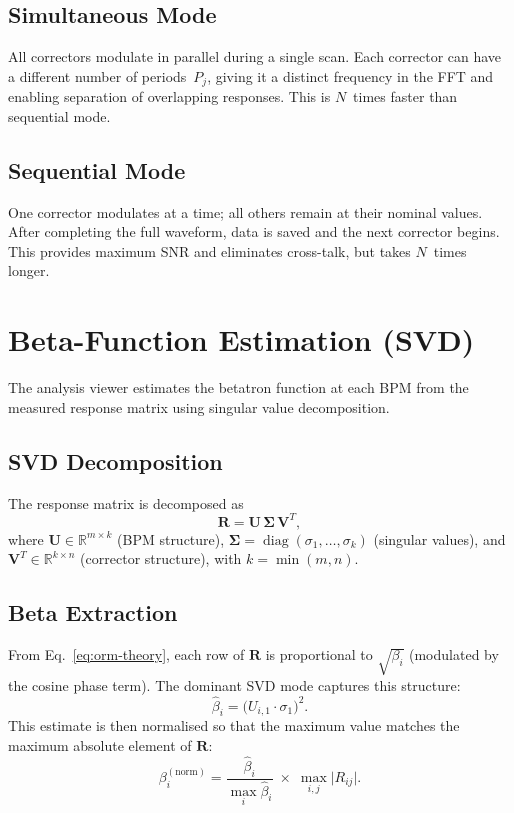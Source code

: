 \documentclass[11pt,a4paper,twoside]{report}
\begin{document}
\subsection{Simultaneous Mode}

All correctors modulate in parallel during a single scan. Each corrector can have a different number of periods~$P_j$, giving it a distinct frequency in the FFT and enabling separation of overlapping responses. This is $N$~times faster than sequential mode.

\subsection{Sequential Mode}

One corrector modulates at a time; all others remain at their nominal values. After completing the full waveform, data is saved and the next corrector begins. This provides maximum SNR and eliminates cross-talk, but takes $N$~times longer.

\section{Beta-Function Estimation (SVD)}\label{sec:svd}

The analysis viewer estimates the betatron function at each BPM from the measured response matrix using singular value decomposition.

\subsection{SVD Decomposition}

The response matrix is decomposed as
\begin{equation}\label{eq:svd}
  \mathbf{R} = \mathbf{U}\,\boldsymbol{\Sigma}\,\mathbf{V}^{T},
\end{equation}
where $\mathbf{U}\in\mathbb{R}^{m\times k}$ (BPM structure), $\boldsymbol{\Sigma}=\operatorname{diag}(\sigma_1,\dots,\sigma_k)$ (singular values), and $\mathbf{V}^{T}\in\mathbb{R}^{k\times n}$ (corrector structure), with $k=\min(m,n)$.

\subsection{Beta Extraction}

From Eq.~\ref{eq:orm-theory}, each row of $\mathbf{R}$ is proportional to $\sqrt{\beta_i}$ (modulated by the cosine phase term). The dominant SVD mode captures this structure:
\begin{equation}\label{eq:beta}
  \hat{\beta}_i = \bigl(U_{i,1}\cdot\sigma_1\bigr)^{2}.
\end{equation}
This estimate is then normalised so that the maximum value matches the maximum absolute element of $\mathbf{R}$:
\begin{equation}
  \beta_i^{(\text{norm})} = \frac{\hat{\beta}_i}{\max_i\hat{\beta}_i}\;\times\;\max_{i,j}\lvert R_{ij}\rvert.
\end{equation}
\end{document}
